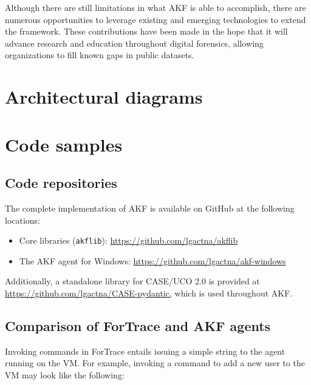 \documentclass[letterpaper,12pt]{report}
\def\tightlist{}
\newcommand{\passthrough}[1]{#1}
\begin{document}
Although there are still limitations in what AKF is able to accomplish,
there are numerous opportunities to leverage existing and emerging
technologies to extend the framework. These contributions have been made
in the hope that it will advance research and education throughout
digital forensics, allowing organizations to fill known gaps in public
datasets.



\printglossary[type=\acronymtype]
\printglossary

\nocite{*}


\appendix

\chapter{Architectural diagrams}\label{appendix-a}



\chapter{Code samples}\label{appendix-b}

\section{Code repositories}\label{code-repositories}

The complete implementation of AKF is available on GitHub at the
following locations:

\begin{itemize}
\tightlist
\item
  Core libraries (\passthrough{\lstinline!akflib!}):
  \url{https://github.com/lgactna/akflib}
\item
  The AKF agent for Windows:
  \url{https://github.com/lgactna/akf-windows}
\end{itemize}

Additionally, a standalone library for CASE/UCO 2.0 is provided at
\url{https://github.com/lgactna/CASE-pydantic,} which is used throughout
AKF.

\section{Comparison of ForTrace and AKF
agents}\label{comparison-of-fortrace-and-akf-agents}

Invoking commands in ForTrace entails issuing a simple string to the
agent running on the VM. For example, invoking a command to add a new
user to the VM may look like the following:
\end{document}
